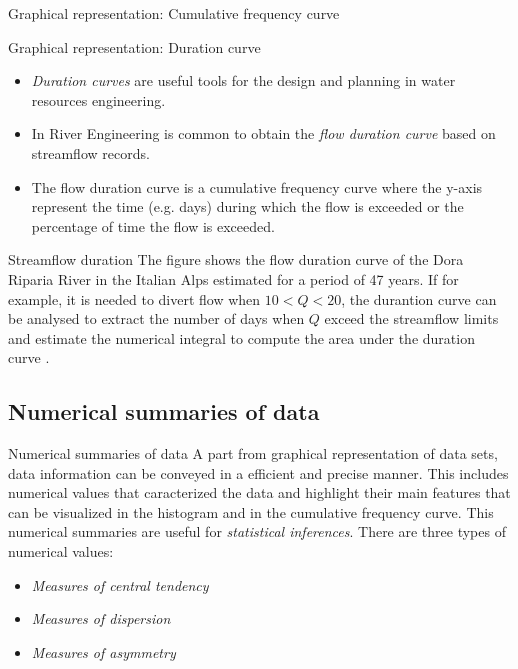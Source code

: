 \documentclass[8pt]{beamer}
\begin{document}
\begin{frame}{Graphical representation: Cumulative frequency curve}
\begin{minipage}{0.495\textwidth}
\end{minipage}
\end{frame}

\begin{frame}{Graphical representation: Duration curve}
    \begin{itemize}
        \item \emph{Duration curves} are useful tools for the design and planning in water resources engineering. 
        \item In River Engineering is common to obtain the \emph{flow duration curve} based on streamflow records. 
        \item The flow duration curve is a cumulative frequency curve where the y-axis represent the time (e.g. days) during which the flow is exceeded or the percentage of time the flow is exceeded. 
    \end{itemize}
    \begin{minipage}{0.495\textwidth}
    \begin{exampleblock}{Streamflow duration}
        The figure shows the flow duration curve of the Dora Riparia River in the Italian Alps estimated for a period of 47 years. If for example, it is needed to divert flow when $10 < Q < 20$, the durantion curve can be analysed to extract the number of days when $Q$ exceed the streamflow limits and estimate the numerical integral to compute the area under the duration curve \citep{kottegoda2008applied}.
    \end{exampleblock}
\end{minipage}
\hfill
\begin{minipage}{0.495\textwidth}
\end{minipage}
\end{frame}

\subsection{Numerical summaries of data}
\begin{frame}{Numerical summaries of data}
    A part from graphical representation of data sets, data information can be conveyed in a efficient and precise manner. This includes numerical values that caracterized the data and highlight their main features that can be visualized in the histogram and in the cumulative frequency curve. This numerical summaries are useful for \emph{statistical inferences}. There are three types of numerical values:
    \begin{itemize}
       \item \emph{Measures of central tendency}
       \item \emph{Measures of dispersion} 
       \item \emph{Measures of asymmetry} 
    \end{itemize}
\end{frame}
\end{document}
